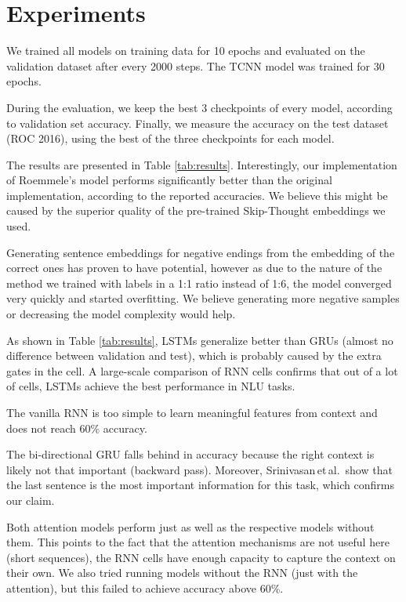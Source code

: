 \documentclass{article}
\begin{document}
\section{Experiments}\label{sec:experiments}
We trained all models on training data for 10 epochs and evaluated on the validation dataset after every 2000 steps.
The TCNN model was trained for 30 epochs.

During the evaluation, we keep the best 3 checkpoints of every model, according to validation set accuracy.
Finally, we measure the accuracy on the test dataset (ROC 2016), using the best of the three checkpoints for each model. 

The results are presented in Table \ref{tab:results}.
Interestingly, our implementation of Roemmele's model performs significantly better than the original implementation,
according to the reported accuracies. We believe this might be caused by the superior quality of the pre-trained Skip-Thought embeddings we used.

Generating sentence embeddings for negative endings from the embedding of the correct ones has proven to have potential,
however as due to the nature of the method we trained with labels in a 1:1 ratio instead of 1:6,
the model converged very quickly and started overfitting. We believe generating more negative samples or decreasing the model complexity would help.

As shown in Table \ref{tab:results}, LSTMs generalize better than GRUs (almost no difference between validation and test), which is probably caused by the extra gates in the cell.
A large-scale comparison of RNN cells confirms that out of a lot of cells, LSTMs achieve the best performance in NLU tasks\citep{JozefowiczAnArchitectures}.

The vanilla RNN is too simple to learn meaningful features from context and does not reach 60\% accuracy.

The bi-directional GRU falls behind in accuracy because the right context is likely not that important (backward pass).
Moreover, Srinivasan\,et\,al.\,\citep{Srinivasan2018ATest} show that the last sentence is the most important information for this task, which confirms our claim.

Both attention models perform just as well as the respective models without them. This points to the fact that the attention mechanisms are not useful here (short sequences), the RNN cells have enough capacity to capture the context on their own. We also tried running models without the RNN (just with the attention), but this failed to achieve accuracy above 60\%.
\end{document}
